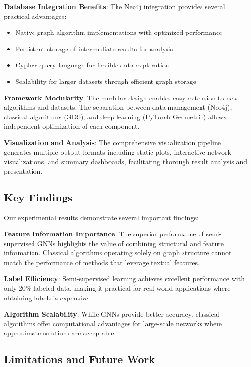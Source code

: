 \documentclass[conference]{IEEEtran}
\begin{document}
\textbf{Database Integration Benefits}: The Neo4j integration provides several practical advantages:
\begin{itemize}
    \item Native graph algorithm implementations with optimized performance
    \item Persistent storage of intermediate results for analysis
    \item Cypher query language for flexible data exploration
    \item Scalability for larger datasets through efficient graph storage
\end{itemize}

\textbf{Framework Modularity}: The modular design enables easy extension to new algorithms and datasets. The separation between data management (Neo4j), classical algorithms (GDS), and deep learning (PyTorch Geometric) allows independent optimization of each component.

\textbf{Visualization and Analysis}: The comprehensive visualization pipeline generates multiple output formats including static plots, interactive network visualizations, and summary dashboards, facilitating thorough result analysis and presentation.

\subsection{Key Findings}

Our experimental results demonstrate several important findings:

\textbf{Feature Information Importance}: The superior performance of semi-supervised GNNs highlights the value of combining structural and feature information. Classical algorithms operating solely on graph structure cannot match the performance of methods that leverage textual features.

\textbf{Label Efficiency}: Semi-supervised learning achieves excellent performance with only 20\% labeled data, making it practical for real-world applications where obtaining labels is expensive.

\textbf{Algorithm Scalability}: While GNNs provide better accuracy, classical algorithms offer computational advantages for large-scale networks where approximate solutions are acceptable.

\subsection{Limitations and Future Work}
\end{document}
